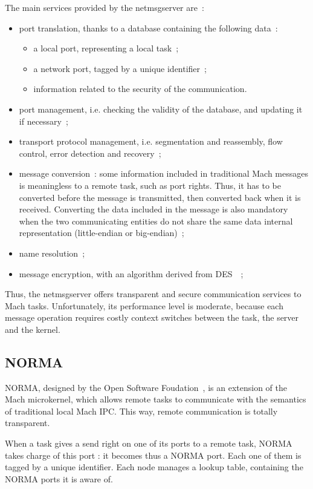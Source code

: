 The main services provided by the netmsgserver are~:
\begin{itemize}
\item port translation, thanks to a database containing the following data~:
	\begin{itemize}
	\item a local port, representing a local task~;
	\item a network port, tagged by a unique identifier~;
	\item information related to the security of the communication.
	\end {itemize}
\item port management, i.e. checking the validity of the database, and updating
 it if necessary~;
\item transport protocol management, i.e. segmentation and reassembly, 
flow control, error detection and recovery~;
\item message conversion~: some information included in traditional Mach 
messages is meaningless to a remote task, such as port rights. Thus, it has 
to be converted before the message is transmitted, then converted back when it
 is received. Converting the data included in the message is also mandatory 
when the two communicating entities do not share the same data internal 
representation (little-endian or big-endian)~;
\item name resolution~;
\item message encryption, with an algorithm derived from DES~\cite{des77}~;
\end {itemize}

Thus, the netmsgserver offers transparent and secure communication services 
to Mach tasks. Unfortunately, its performance level is moderate, because each
 message operation requires costly context switches between the task, the 
server and the kernel.

\subsection{NORMA}

NORMA, designed by the Open Software Foudation~\cite{norma93,norma94}, 
is an extension of the Mach microkernel, which allows remote tasks to 
communicate with the semantics of traditional local Mach IPC. This way, 
remote communication is totally transparent.

When a task gives a send right on one of its ports to a remote task, NORMA 
takes charge of this port : it becomes thus a NORMA port. Each one of them 
is tagged by a unique identifier. Each node manages a lookup table, containing 
the NORMA ports it is aware of.

